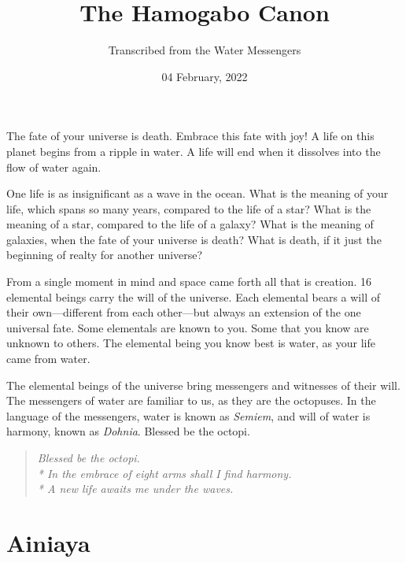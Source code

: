 \documentclass[12pt, letterpaper]{report}
\begin{document}
 
\title{The Hamogabo Canon}
 \date{04 February, 2022}
\author{Transcribed from the Water Messengers}  
\maketitle



The fate of your universe is death. Embrace this fate with joy! A life on this planet begins from a ripple in water. A life will end when it dissolves into the flow of water again.

\vspace{1\baselineskip}
One life is as insignificant as a wave in the ocean. What is the meaning of your life, which spans so many years, compared to the life of a star? What is the meaning of a star, compared to the life of a galaxy? What is the meaning of galaxies, when the fate of your universe is death? What is death, if it just the beginning of realty for another universe?

\vspace{1\baselineskip}
From a single moment in mind and space came forth all that is creation. 16 elemental beings carry the will of the universe. Each elemental bears a will of their own---different from each other---but always an extension of the one universal fate. Some elementals are known to you.  Some that you know are unknown to others. The elemental being you know best is water, as your life came from water.

\vspace{1\baselineskip}
The elemental beings of the universe bring messengers and witnesses of their will. The messengers of water are familiar to us, as they are the octopuses. In the language of the messengers, water is known as \textit{Semiem}, and will of water is harmony, known as \textit{Dohnia}. Blessed be the octopi.

\begin{quote}
{\textit{
	Blessed be the octopi.\\*
	In the embrace of eight arms shall I find harmony.\\*
	A new life awaits me under the waves. 
}}
\end{quote}

\part{Ainiaya}

\chapter{}
\end{document}

